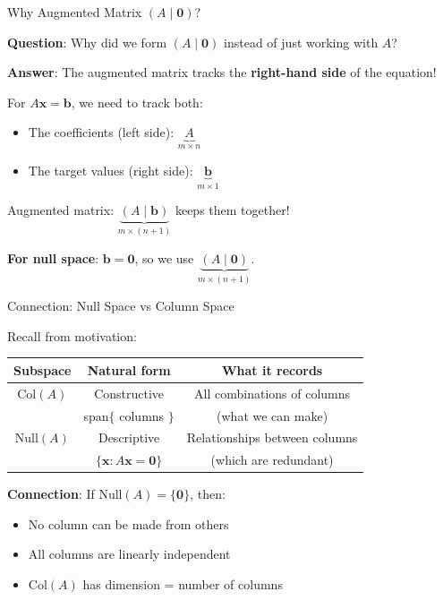 \documentclass[10pt]{beamer}
\theoremstyle{definition}
\newcommand{\x}[1]{\alert{\textbf{#1}}}
\begin{document}
\begin{frame}{Why Augmented Matrix $(A \mid \mathbf{0})$?}

\x{Question}: Why did we form $(A \mid \mathbf{0})$ instead of just working with $A$?

\vspace{1em}

\x{Answer}: The augmented matrix tracks the \textbf{right-hand side} of the equation!

\vspace{0.5em}

For $A\mathbf{x} = \mathbf{b}$, we need to track both:
\begin{itemize}
\item The coefficients (left side): $\underbrace{A}_{m \times n}$
\item The target values (right side): $\underbrace{\mathbf{b}}_{m \times 1}$
\end{itemize}

\vspace{1em}

Augmented matrix: $\underbrace{(A \mid \mathbf{b})}_{m \times (n+1)}$ keeps them together!

\vspace{0.5em}

\x{For null space}: $\mathbf{b} = \mathbf{0}$, so we use $\underbrace{(A \mid \mathbf{0})}_{m \times (n+1)}$.

\end{frame}

\begin{frame}{Connection: Null Space vs Column Space}

Recall from motivation:

\begin{center}
\begin{tabular}{|c|c|c|}
\hline
\textbf{Subspace} & \textbf{Natural form} & \textbf{What it records} \\
\hline
$\text{Col}(A)$ & Constructive & All combinations of columns \\
 & span$\{$ columns $\}$ & (what we can make) \\
\hline
$\text{Null}(A)$ & Descriptive & Relationships between columns \\
 & $\{\mathbf{x} : A\mathbf{x} = \mathbf{0}\}$ & (which are redundant) \\
\hline
\end{tabular}
\end{center}

\vspace{1em}

\x{Connection}: If $\text{Null}(A) = \{\mathbf{0}\}$, then:
\begin{itemize}
\item No column can be made from others
\item All columns are linearly independent
\item $\text{Col}(A)$ has dimension = number of columns
\end{itemize}

\end{frame}
\end{document}
